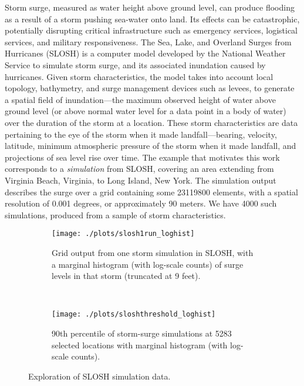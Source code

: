 Storm surge, measured as water height above ground level, can produce flooding as a result
    of a storm pushing sea-water onto land.  Its effects can be catastrophic, potentially
    disrupting critical infrastructure such as emergency services, logistical services,
    and military responsiveness.   The Sea, Lake, and Overland Surges from Hurricanes 
    (SLOSH)\citep{jelesnianski1992} is a 
    computer model developed by the National Weather Service to simulate storm 
    surge, and its associated inundation caused by hurricanes.   Given storm 
    characteristics, the model takes into account local topology, bathymetry, 
    and surge management devices such as levees, to generate a spatial field of 
    inundation---the maximum observed height of water above ground level 
    (or above normal water level for a data point in a body of water) over the 
    duration of the storm at a location.   These storm characteristics are
    data pertaining to the eye of the storm when it made landfall---bearing, 
    velocity, latitude, minimum atmospheric pressure of the storm when it 
    made landfall, and projections of sea level rise over time.  The example that motivates
    this work corresponds to a \emph{simulation} from SLOSH, covering an area extending 
    from Virginia Beach, Virginia, to Long Island, New York.
    The simulation output describes the surge over a grid containing some \num{23119800} 
    elements, with a spatial resolution of \num{0.001} degrees, or approximately 90 
    meters.   We have \num{4000} such simulations, produced from a sample of 
    storm characteristics. 

\begin{figure}[t!]
    \centering
    \begin{subfigure}[t]{0.48\textwidth}
        \centering
        \texttt{[image: ./plots/slosh1run\_loghist]}
        \caption{Grid output from one storm simulation in SLOSH, with a marginal
            histogram (with log-scale counts) of surge levels in that storm 
            (truncated at 9 feet).\label{fig:slosh1run}}
    \end{subfigure}%
    ~ 
    \begin{subfigure}[t]{0.48\textwidth}
        \centering
        \texttt{[image: ./plots/sloshthreshold\_loghist]}
        \caption{
            90th percentile of storm-surge simulations at \num{5283} selected 
            locations with marginal histogram (with log-scale counts).
            \label{fig:sloshthreshold}}
    \end{subfigure}
    \caption{Exploration of SLOSH simulation data.\label{fig:sloshexplore}}
\end{figure}

